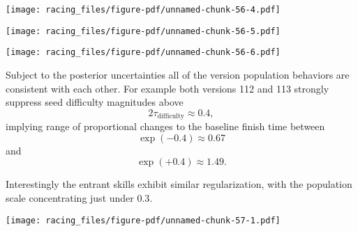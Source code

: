 \documentclass[
  letterpaper,
  DIV=11,
  numbers=noendperiod]{scrartcl}
\newenvironment{Shaded}{\begin{snugshade}}{\end{snugshade}}
\newcommand{\AttributeTok}[1]{\textcolor[rgb]{0.40,0.45,0.13}{#1}}
\newcommand{\ControlFlowTok}[1]{\textcolor[rgb]{0.00,0.23,0.31}{#1}}
\newcommand{\DecValTok}[1]{\textcolor[rgb]{0.68,0.00,0.00}{#1}}
\newcommand{\FunctionTok}[1]{\textcolor[rgb]{0.28,0.35,0.67}{#1}}
\newcommand{\NormalTok}[1]{\textcolor[rgb]{0.00,0.23,0.31}{#1}}
\newcommand{\OtherTok}[1]{\textcolor[rgb]{0.00,0.23,0.31}{#1}}
\newcommand{\SpecialCharTok}[1]{\textcolor[rgb]{0.37,0.37,0.37}{#1}}
\newcommand{\StringTok}[1]{\textcolor[rgb]{0.13,0.47,0.30}{#1}}
\begin{document}
\texttt{[image: racing\_files/figure-pdf/unnamed-chunk-56-4.pdf]}

\texttt{[image: racing\_files/figure-pdf/unnamed-chunk-56-5.pdf]}

\texttt{[image: racing\_files/figure-pdf/unnamed-chunk-56-6.pdf]}

Subject to the posterior uncertainties all of the version population
behaviors are consistent with each other. For example both versions 112
and 113 strongly suppress seed difficulty magnitudes above \[
2 \tau_{\mathrm{difficulty}} \approx 0.4,
\] implying range of proportional changes to the baseline finish time
between \[
\exp(-0.4) \approx 0.67
\] and \[
\exp(+0.4) \approx 1.49.
\]

Interestingly the entrant skills exhibit similar regularization, with
the population scale concentrating just under \(0.3\).

\begin{Shaded}
\end{Shaded}

\texttt{[image: racing\_files/figure-pdf/unnamed-chunk-57-1.pdf]}
\end{document}
